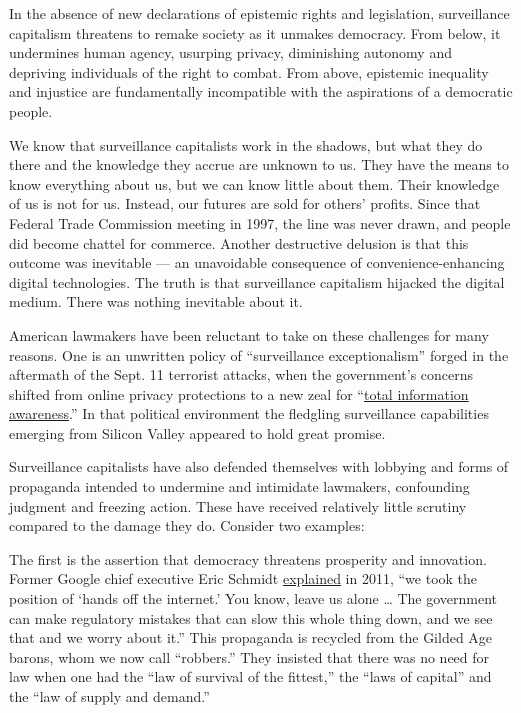 In the absence of new declarations of epistemic rights and legislation,
surveillance capitalism threatens to remake society as it unmakes
democracy. From below, it undermines human agency, usurping privacy,
diminishing autonomy and depriving individuals of the right to combat.
From above, epistemic inequality and injustice are fundamentally
incompatible with the aspirations of a democratic people.

We know that surveillance capitalists work in the shadows, but what they
do there and the knowledge they accrue are unknown to us. They have the
means to know everything about us, but we can know little about them.
Their knowledge of us is not for us. Instead, our futures are sold for
others' profits. Since that Federal Trade Commission meeting in 1997,
the line was never drawn, and people did become chattel for commerce.
Another destructive delusion is that this outcome was inevitable --- an
unavoidable consequence of convenience-enhancing digital technologies.
The truth is that surveillance capitalism hijacked the digital medium.
There was nothing inevitable about it.

American lawmakers have been reluctant to take on these challenges for
many reasons. One is an unwritten policy of ``surveillance
exceptionalism'' forged in the aftermath of the Sept. 11 terrorist
attacks, when the government's concerns shifted from online privacy
protections to a new zeal for
``\href{https://www.nytimes.com/2002/12/15/magazine/the-year-in-ideas-total-information-awareness.html}{total
information awareness}.'' In that political environment the fledgling
surveillance capabilities emerging from Silicon Valley appeared to hold
great promise.

Surveillance capitalists have also defended themselves with lobbying and
forms of propaganda intended to undermine and intimidate lawmakers,
confounding judgment and freezing action. These have received relatively
little scrutiny compared to the damage they do. Consider two examples:

The first is the assertion that democracy threatens prosperity and
innovation. Former Google chief executive Eric Schmidt
\href{https://www.washingtonpost.com/national/on-leadership/googles-eric-schmidt-expounds-on-his-senate-testimony/2011/09/30/gIQAPyVgCL_story.html}{explained}
in 2011, ``we took the position of `hands off the internet.' You know,
leave us alone \ldots{} The government can make regulatory mistakes that
can slow this whole thing down, and we see that and we worry about it.''
This propaganda is recycled from the Gilded Age barons, whom we now call
``robbers.'' They insisted that there was no need for law when one had
the ``law of survival of the fittest,'' the ``laws of capital'' and the
``law of supply and demand.''


